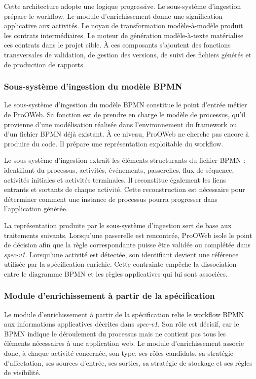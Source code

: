 Cette architecture adopte une logique progressive. Le sous-système d'ingestion prépare le workflow. Le module d'enrichissement donne une signification applicative aux activités. Le noyau de transformation modèle-à-modèle produit les contrats intermédiaires. Le moteur de génération modèle-à-texte matérialise ces contrats dans le projet cible. À ces composants s'ajoutent des fonctions transversales de validation, de gestion des versions, de suivi des fichiers générés et de production de rapports.

\subsubsection{Sous-système d'ingestion du modèle BPMN}

Le sous-système d'ingestion du modèle BPMN constitue le point d'entrée métier de ProOWeb. Sa fonction est de prendre en charge le modèle de processus, qu'il provienne d'une modélisation réalisée dans l'environnement du framework ou d'un fichier BPMN déjà existant. À ce niveau, ProOWeb ne cherche pas encore à produire du code. Il prépare une représentation exploitable du workflow.

Le sous-système d'ingestion extrait les éléments structurants du fichier BPMN : identifiant du processus, activités, événements, passerelles, flux de séquence, activités initiales et activités terminales. Il reconstitue également les liens entrants et sortants de chaque activité. Cette reconstruction est nécessaire pour déterminer comment une instance de processus pourra progresser dans l'application générée.

La représentation produite par le sous-système d'ingestion sert de base aux traitements suivants. Lorsqu'une passerelle est rencontrée, ProOWeb isole le point de décision afin que la règle correspondante puisse être validée ou complétée dans \textit{spec-v1}. Lorsqu'une activité est détectée, son identifiant devient une référence utilisée par la spécification enrichie. Cette contrainte empêche la dissociation entre le diagramme BPMN et les règles applicatives qui lui sont associées.

\subsubsection{Module d'enrichissement à partir de la spécification}

Le module d'enrichissement à partir de la spécification relie le workflow BPMN aux informations applicatives décrites dans \textit{spec-v1}. Son rôle est décisif, car le BPMN indique le déroulement du processus mais ne contient pas tous les éléments nécessaires à une application web. Le module d'enrichissement associe donc, à chaque activité concernée, son type, ses rôles candidats, sa stratégie d'affectation, ses sources d'entrée, ses sorties, sa stratégie de stockage et ses règles de visibilité.


